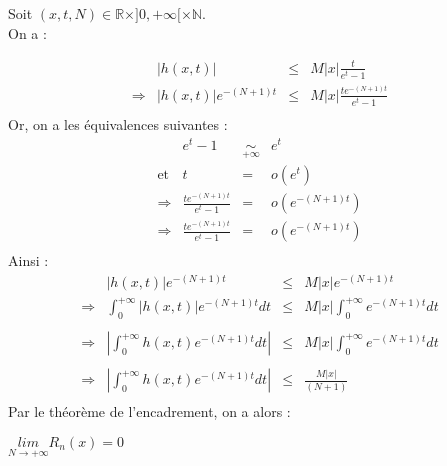 Soit $(x, t, N)\in \mathbb{R}\times]0, +\infty[\times\mathbb{N}$.\\
On a :

\[
  \begin{array}{rrcl}
                & |h(x, t)|             & \leq & M|x|\frac{t}{e^t-1}            \\
    \Rightarrow & |h(x, t)| e^{-(N+1)t} & \leq & M|x|\frac{te^{-(N+1)t}}{e^t-1} \\
  \end{array}
\]
Or, on a les équivalences suivantes :
\[
  \begin{array}{rrcl}
                & e^t-1                      & \underset{+\infty}{\sim} & e^t            \\
    \text{et}   & t                          & =                        & o(e^t)         \\
    \Rightarrow & \frac{te^{-(N+1)t}}{e^t-1} & =                        & o(e^{-(N+1)t}) \\
    \Rightarrow & \frac{te^{-(N+1)t}}{e^t-1} & =                        & o(e^{-(N+1)t}) \\
  \end{array}
\]
Ainsi :
\[
  \begin{array}{rrcl}
                & |h(x, t)| e^{-(N+1)t}                                    & \leq & M|x|e^{-(N+1)t}                       \\
    \Rightarrow & \int_{0}^{+\infty} {|h(x, t)| e^{-(N+1)t} dt}            & \leq & M|x|\int_{0}^{+\infty}{e^{-(N+1)t}dt} \\\\
    \Rightarrow & \left|\int_{0}^{+\infty} {h(x, t) e^{-(N+1)t} dt}\right| & \leq & M|x|\int_{0}^{+\infty}{e^{-(N+1)t}dt} \\\\
    \Rightarrow & \left|\int_{0}^{+\infty} {h(x, t) e^{-(N+1)t} dt}\right| & \leq & \frac{M|x|}{(N+1)}                    \\
  \end{array}
\]
Par le théorème de l'encadrement, on a alors :
\begin{result}
  $\underset{N\rightarrow +\infty}{lim}R_n(x) = 0$
\end{result}
